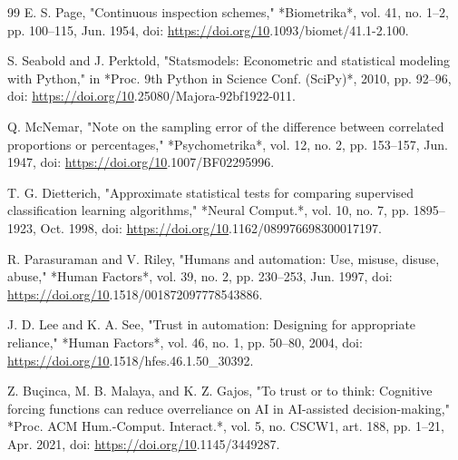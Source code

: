 \begin{thebibliography}{99}
 E. S. Page, "Continuous inspection schemes," *Biometrika*, vol. 41, no. 1–2, pp. 100–115, Jun. 1954, doi: \url{https://doi.org/10}.1093/biomet/41.1-2.100.

 S. Seabold and J. Perktold, "Statsmodels: Econometric and statistical modeling with Python," in *Proc. 9th Python in Science Conf. (SciPy)*, 2010, pp. 92–96, doi: \url{https://doi.org/10}.25080/Majora-92bf1922-011.

 Q. McNemar, "Note on the sampling error of the difference between correlated proportions or percentages," *Psychometrika*, vol. 12, no. 2, pp. 153–157, Jun. 1947, doi: \url{https://doi.org/10}.1007/BF02295996.

 T. G. Dietterich, "Approximate statistical tests for comparing supervised classification learning algorithms," *Neural Comput.*, vol. 10, no. 7, pp. 1895–1923, Oct. 1998, doi: \url{https://doi.org/10}.1162/089976698300017197.

 R. Parasuraman and V. Riley, "Humans and automation: Use, misuse, disuse, abuse," *Human Factors*, vol. 39, no. 2, pp. 230–253, Jun. 1997, doi: \url{https://doi.org/10}.1518/001872097778543886.

 J. D. Lee and K. A. See, "Trust in automation: Designing for appropriate reliance," *Human Factors*, vol. 46, no. 1, pp. 50–80, 2004, doi: \url{https://doi.org/10}.1518/hfes.46.1.50\_30392.

 Z. Buçinca, M. B. Malaya, and K. Z. Gajos, "To trust or to think: Cognitive forcing functions can reduce overreliance on AI in AI-assisted decision-making," *Proc. ACM Hum.-Comput. Interact.*, vol. 5, no. CSCW1, art. 188, pp. 1–21, Apr. 2021, doi: \url{https://doi.org/10}.1145/3449287.

\end{thebibliography}